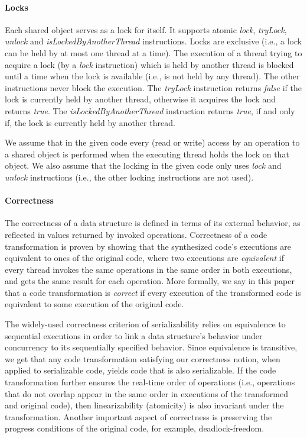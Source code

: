 \paragraph{Locks}
Each shared object serves as a lock for itself.
It supports atomic \emph{lock}, \emph{tryLock}, \emph{unlock} and \emph{isLockedByAnotherThread} instructions.
Locks are exclusive (i.e., a lock can be held by at most one thread at a time).
The execution of a thread
trying to acquire a lock (by a \emph{lock} instruction) which is
held by another thread is blocked until a time when the
lock is available (i.e., is not held by any thread).
The other instructions never block the execution.
The \emph{tryLock} instruction returns \emph{false} if the lock is currently held by another thread, otherwise it acquires the lock and returns \emph{true}.
The \emph{isLockedByAnotherThread} instruction returns \emph{true}, if and only if, the lock is currently held by another thread.

We assume that in the given code every (read
or write) access by an operation to a shared object is performed when the
executing thread holds the lock on that object.
We also assume that the locking in the given code only uses \emph{lock} and \emph{unlock} instructions 
(i.e., the other locking instructions are not used).



\paragraph{Correctness}

The correctness of a data structure is defined in terms of its external behavior, as reflected in values returned by invoked operations.
Correctness of a code transformation is proven by showing that the synthesized code's executions are equivalent to ones of the original code,
where two executions are  \emph{equivalent} if every thread invokes the same
operations in the same order  in both executions, and gets the same result for each operation. More formally, we say in this paper that a code transformation is \emph{correct} if every execution of the transformed code
is equivalent to some execution of the original code.

The widely-used correctness criterion of serializability relies on equivalence to sequential executions in order to
link a data structure's behavior under concurrency to its sequentially specified behavior. Since equivalence is transitive,
we get that any code transformation satisfying our correctness notion, when applied to serializable code, yields code that is also serializable.
If the code transformation further ensures the real-time order of operations (i.e., operations that do not overlap appear in the same order in
executions of the transformed and original code), then linearizability (atomicity) is also invariant under the transformation.
Another important aspect of correctness is preserving the progress conditions of the original code, for example, deadlock-freedom.

